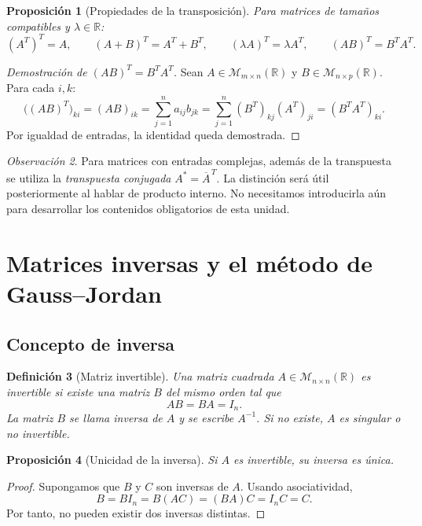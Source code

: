 \documentclass[12pt]{article}
\newtheorem{definicion}{Definición}[section]
\newtheorem{proposicion}[definicion]{Proposición}
\theoremstyle{remark}
\newtheorem{observacion}[definicion]{Observación}
\newcommand{\R}{\mathbb{R}}
\newcommand{\Mat}[2]{\mathcal{M}_{#1\times #2}}
\begin{document}
\begin{proposicion}[Propiedades de la transposición]
Para matrices de tamaños compatibles y $\lambda\in\R$:
\[
(A^T)^T=A,\qquad(A+B)^T=A^T+B^T,\qquad
(\lambda A)^T=\lambda A^T,\qquad (AB)^T=B^TA^T.
\]
\end{proposicion}
\begin{proof}[Demostración de $(AB)^T=B^TA^T$]
Sean $A\in\Mat{m}{n}(\R)$ y $B\in\Mat{n}{p}(\R)$. Para cada $i,k$:
\[
\bigl((AB)^T\bigr)_{ki}=(AB)_{ik}
=\sum_{j=1}^{n}a_{ij}b_{jk}
=\sum_{j=1}^{n}(B^T)_{kj}(A^T)_{ji}
=(B^TA^T)_{ki}.
\]
Por igualdad de entradas, la identidad queda demostrada.
\end{proof}

\begin{observacion}
Para matrices con entradas complejas, además de la transpuesta se utiliza la \emph{transpuesta conjugada} $A^*=\overline{A}^{\,T}$. La distinción será útil posteriormente al hablar de producto interno. No necesitamos introducirla aún para desarrollar los contenidos obligatorios de esta unidad.
\end{observacion}

\section{Matrices inversas y el método de Gauss--Jordan}
\subsection{Concepto de inversa}
\begin{definicion}[Matriz invertible]
Una matriz cuadrada $A\in\Mat{n}{n}(\R)$ es \emph{invertible} si existe una matriz $B$ del mismo orden tal que
\[
AB=BA=I_n.
\]
La matriz $B$ se llama \emph{inversa} de $A$ y se escribe $A^{-1}$. Si no existe, $A$ es \emph{singular} o \emph{no invertible}.
\end{definicion}

\begin{proposicion}[Unicidad de la inversa]
Si $A$ es invertible, su inversa es única.
\end{proposicion}
\begin{proof}
Supongamos que $B$ y $C$ son inversas de $A$. Usando asociatividad,
\[
B=BI_n=B(AC)=(BA)C=I_nC=C.
\]
Por tanto, no pueden existir dos inversas distintas.
\end{proof}
\end{document}
